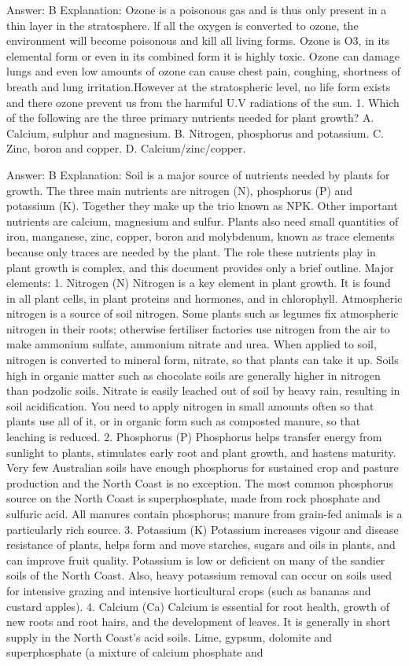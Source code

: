 Answer: B
Explanation: Ozone is a poisonous gas and is thus only present in a thin layer in the stratosphere. lf all the oxygen is converted to ozone, the environment will become poisonous and kill all living forms. Ozone is O3, in its elemental form or even in its combined form it is highly toxic. Ozone can damage lungs and even low amounts of ozone can cause chest pain, coughing, shortness of breath and lung irritation.However at the stratospheric level, no life form exists and there ozone prevent us from the harmful U.V radiations of the sun. 1. Which of the following are the three primary nutrients needed for plant growth? A. Calcium, sulphur and magnesium. B. Nitrogen, phosphorus and potassium. C. Zinc, boron and copper. D. Calcium/zinc/copper. 

Answer: B
Explanation: Soil is a major source of nutrients needed by plants for growth. The three main nutrients are nitrogen (N), phosphorus (P) and potassium (K). Together they make up the trio known as NPK. Other important nutrients are calcium, magnesium and sulfur. Plants also need small quantities of iron, manganese, zinc, copper, boron and molybdenum, known as trace elements because only traces are needed by the plant. The role these nutrients play in plant growth is complex, and this document provides only a brief outline. Major elements: 1. Nitrogen (N) Nitrogen is a key element in plant growth. It is found in all plant cells, in plant proteins and hormones, and in chlorophyll. Atmospheric nitrogen is a source of soil nitrogen. Some plants such as legumes fix atmospheric nitrogen in their roots; otherwise fertiliser factories use nitrogen from the air to make ammonium sulfate, ammonium nitrate and urea. When applied to soil, nitrogen is converted to mineral form, nitrate, so that plants can take it up. Soils high in organic matter such as chocolate soils are generally higher in nitrogen than podzolic soils. Nitrate is easily leached out of soil by heavy rain, resulting in soil acidification. You need to apply nitrogen in small amounts often so that plants use all of it, or in organic form such as composted manure, so that leaching is reduced. 2. Phosphorus (P) Phosphorus helps transfer energy from sunlight to plants, stimulates early root and plant growth, and hastens maturity. Very few Australian soils have enough phosphorus for sustained crop and pasture production and the North Coast is no exception. The most common phosphorus source on the North Coast is superphosphate, made from rock phosphate and sulfuric acid. All manures contain phosphorus; manure from grain-fed animals is a particularly rich source. 3. Potassium (K) Potassium increases vigour and disease resistance of plants, helps form and move starches, sugars and oils in plants, and can improve fruit quality. Potassium is low or deficient on many of the sandier soils of the North Coast. Also, heavy potassium removal can occur on soils used for intensive grazing and intensive horticultural crops (such as bananas and custard apples). 4. Calcium (Ca) Calcium is essential for root health, growth of new roots and root hairs, and the development of leaves. It is generally in short supply in the North Coast's acid soils. Lime, gypsum, dolomite and superphosphate (a mixture of calcium phosphate and 